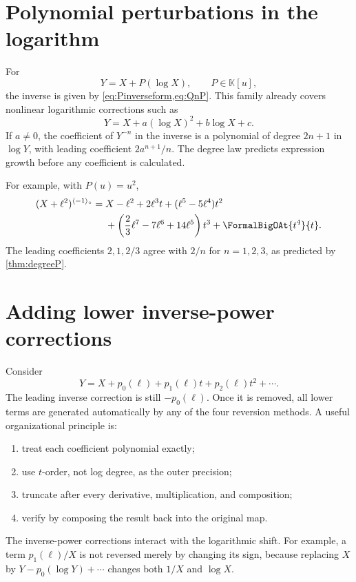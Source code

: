 \documentclass[11pt,oneside,openany]{book}
\newcommand{\K}{\mathbb{K}}
\newcommand{\rev}{^{\langle-1\rangle_{\circ}}}
\begin{document}
\section{Polynomial perturbations in the logarithm}
For
\[
 Y=X+P(\log X),
 \qquad P\in\K[u],
\]
the inverse is given by \cref{eq:Pinverseform,eq:QnP}.  This family already
covers nonlinear logarithmic corrections such as
\begin{equation}\label{eq:quadraticlogmap}
 Y=X+a(\log X)^2+b\log X+c.
\end{equation}
If \(a\neq0\), the coefficient of \(Y^{-n}\) in the inverse is a polynomial of
degree \(2n+1\) in \(\log Y\), with leading coefficient
\(2a^{n+1}/n\).  The degree law predicts expression growth before any
coefficient is calculated.

For example, with \(P(u)=u^2\),
\begin{align}
 (X+\ell^2)\rev
 ={}&X-\ell^2+2\ell^3t
 +(\ell^5-5\ell^4)t^2\notag\\
 &+\left(\frac23\ell^7-7\ell^6+14\ell^5\right)t^3
 +\FormalBigOAt{t^4}{t}.
 \label{eq:quadraticloginverse}
\end{align}
The leading coefficients \(2,1,2/3\) agree with
\(2/n\) for \(n=1,2,3\), as predicted by \cref{thm:degreeP}.

\section{Adding lower inverse-power corrections}
Consider
\begin{equation}\label{eq:generalphiwithpowers}
 Y=X+p_0(\ell)+p_1(\ell)t+p_2(\ell)t^2+\cdots.
\end{equation}
The leading inverse correction is still \(-p_0(\ell)\).  Once it is removed,
all lower terms are generated automatically by any of the four reversion
methods.  A useful organizational principle is:

\begin{enumerate}
\item treat each coefficient polynomial exactly;
\item use \(t\)-order, not log degree, as the outer precision;
\item truncate after every derivative, multiplication, and composition;
\item verify by composing the result back into the original map.
\end{enumerate}

The inverse-power corrections interact with the logarithmic shift.  For
example, a term \(p_1(\ell)/X\) is not reversed merely by changing its sign,
because replacing \(X\) by \(Y-p_0(\log Y)+\cdots\) changes both \(1/X\) and
\(\log X\).
\end{document}
